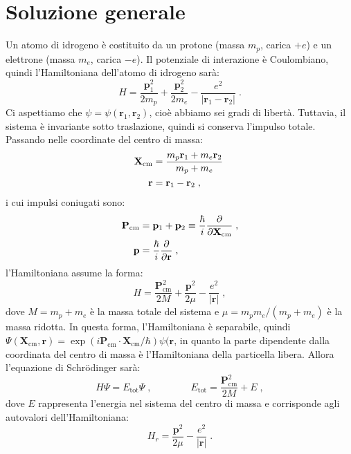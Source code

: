 \documentclass[12pt,a4paper]{report}
\theoremstyle{definition}
\numberwithin{equation}{section}
\newcommand{\Sch}{Schrödinger}
\begin{document}
\section{Soluzione generale}
Un atomo di idrogeno è costituito da un protone (massa $m_p$, carica $+e$) e un elettrone (massa $m_e$, carica $-e$). Il potenziale di interazione è Coulombiano, quindi l'Hamiltoniana dell'atomo di idrogeno sarà:
\begin{equation}
H=\frac{\mathbf{p}_1^2}{2m_p}+\frac{\mathbf{p}_2^2}{2m_e}-\frac{e^2}{|\mathbf{r}_1-\mathbf{r}_2|}\;.
\end{equation}
Ci aspettiamo che $\psi=\psi(\mathbf{r}_1,\mathbf{r}_2)$, cioè abbiamo sei gradi di libertà. Tuttavia, il sistema è invariante sotto traslazione, quindi si conserva l'impulso totale. Passando nelle coordinate del centro di massa:
\begin{align}
\mathbf{X}_{\mathrm{cm}}&=\frac{m_p\mathbf{r}_1+m_e\mathbf{r}_2}{m_p+m_e}\; \notag \\
\mathbf{r}&=\mathbf{r}_1-\mathbf{r}_2\;,
\end{align}
i cui impulsi coniugati sono:
\begin{align}
\mathbf{P}_{\mathrm{cm}}&=\mathbf{p}_1+\mathbf{p}_2\equiv\frac{\hbar}{i}\frac{\partial}{\partial\mathbf{X}_{\mathrm{cm}}}\;, \notag \\
\mathbf{p} &=\frac{\hbar}{i}\frac{\partial}{\partial\mathbf{r}}\;,
\end{align}
l'Hamiltoniana assume la forma:
\begin{equation}
H=\frac{\mathbf{P}_{\mathrm{cm}}^2}{2M}+\frac{\mathbf{p}^2}{2\mu}-\frac{e^2}{|\mathbf{r}|}\;,
\end{equation}
dove $M=m_p+m_e$ è la massa totale del sistema e $\mu=m_pm_e/(m_p+m_e)$ è la massa ridotta. In questa forma, l'Hamiltoniana è separabile, quindi $\Psi(\mathbf{X}_{\mathrm{cm}},\mathbf{r})=\exp(i\mathbf{P}_{\mathrm{cm}}\cdot\mathbf{X}_{\mathrm{cm}}/\hbar)\psi(\mathbf{r}$, in quanto la parte dipendente dalla coordinata del centro di massa è l'Hamiltoniana della particella libera. Allora l'equazione di \Sch\; sarà:
\begin{equation}
H\Psi=E_{\mathrm{tot}}\Psi\;, \qquad \qquad E_{\mathrm{tot}}=\frac{\mathbf{P}_{\mathrm{cm}}^2}{2M}+E\;,
\end{equation}
dove $E$ rappresenta l'energia nel sistema del centro di massa e corrisponde agli autovalori dell'Hamiltoniana:
\begin{equation}
H_r=\frac{\mathbf{p}^2}{2\mu}-\frac{e^2}{|\mathbf{r}|}\;.
\end{equation}
\end{document}
